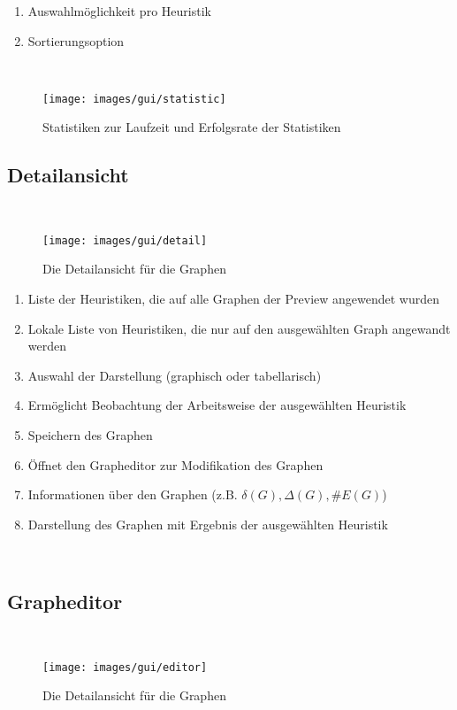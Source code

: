 \documentclass{article}
\begin{document}
	\begin{enumerate}[(1)]
		\item{Auswahlmöglichkeit pro Heuristik}
		\item{Sortierungsoption}
	\end{enumerate}
	
	~\begin{figure}[!h]
		\centering
		\texttt{[image: images/gui/statistic]}
		\caption{Statistiken zur Laufzeit und Erfolgsrate der Statistiken}
	\end{figure}
	
	
	
	\subsection{Detailansicht}
	~\begin{figure}[!h]
		\centering
		\texttt{[image: images/gui/detail]}
		\caption{Die Detailansicht für die Graphen}
	\end{figure}
	
	\FloatBarrier
	
	\begin{enumerate}[(1)]
		\item{Liste der Heuristiken, die auf alle Graphen der Preview angewendet wurden}
		\item{Lokale Liste von Heuristiken, die nur auf den ausgewählten Graph angewandt werden}
		\item{Auswahl der Darstellung (graphisch oder tabellarisch)}
		\item{Ermöglicht Beobachtung der Arbeitsweise der ausgewählten Heuristik}
		\item{Speichern des Graphen}
		\item{Öffnet den Grapheditor zur Modifikation des Graphen}
		\item{Informationen über den Graphen (z.B. $\delta (G), \Delta (G), \# E(G)$)}
		\item{Darstellung des Graphen mit Ergebnis der ausgewählten Heuristik}
	\end{enumerate}
	
	
	
	
	~\newpage
	\subsection{Grapheditor}
	~\begin{figure}[!h]
		\centering
		\texttt{[image: images/gui/editor]}
		\caption{Die Detailansicht für die Graphen}
	\end{figure}
	
\end{document}
